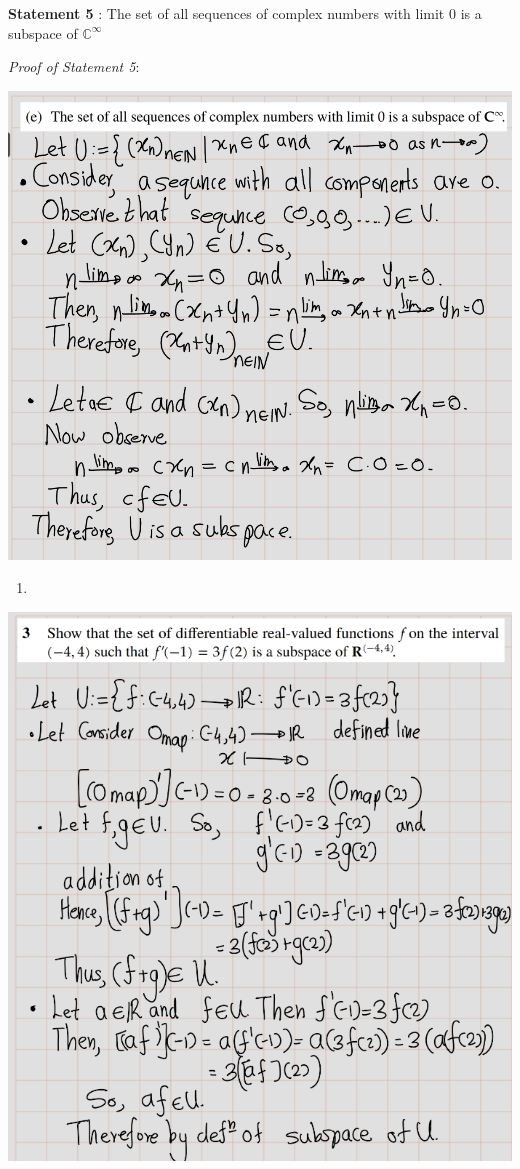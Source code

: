 \documentclass[
]{book}
\providecommand{\tightlist}{%
  \setlength{\itemsep}{0pt}\setlength{\parskip}{0pt}}
\theoremstyle{definition}
\theoremstyle{definition}
\theoremstyle{definition}
\theoremstyle{definition}
\theoremstyle{remark}
\begin{document}
\textbf{Statement 5} : The set of all sequences of complex numbers with limit \(0\) is a subspace of \(\mathbb{C}^{\infty}\)

\emph{Proof of Statement 5}:

\includegraphics{fig/Ex1C/Ex2-e.png}

\begin{enumerate}
\def\labelenumi{\arabic{enumi}.}
\setcounter{enumi}{2}
\tightlist
\item
  \hfill\break
\end{enumerate}

\includegraphics{fig/Ex1C/Ex3.png}
\end{document}
